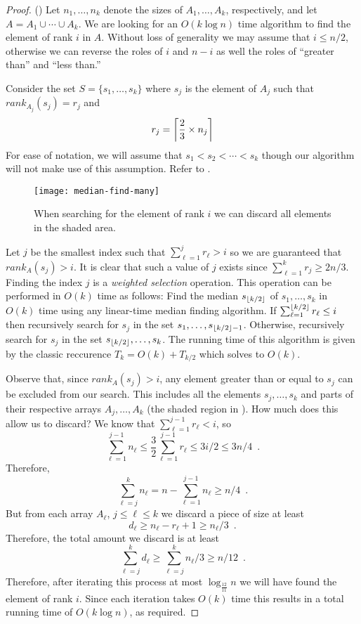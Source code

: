 \documentclass{njcarticle}
\newcommand{\rank}{\mathord{rank}}
\begin{document}
\begin{proof}() 
Let $n_1,\ldots,n_k$ denote the sizes of $A_1,\ldots,A_k$,
respectively, and let $A=A_1\cup\cdots\cup A_k$.  We are looking for
an $O(k\log n)$ time algorithm to find the element of rank $i$ in $A$.
Without loss of generality we may assume that $i\le n/2$, otherwise we
can reverse the roles of $i$ and $n-i$ as well the roles of ``greater
than'' and ``less than.''  

Consider the set $S=\{s_1,\ldots,s_k\}$ where $s_j$ is the element
of $A_j$ such that $\rank_{A_j}(s_j)=r_j$ and 
\[
  r_j = \left\lceil \frac{2}{3}\times n_j \right\rceil
\]
For ease of notation, we will assume that $s_1<s_2<\cdots<s_k$ though
our algorithm will not make use of this assumption.  Refer to
. 

\begin{figure}
\begin{center}\texttt{[image: median-find-many]}\end{center}
\caption{When searching for the element of rank $i$ we can discard all
elements in the shaded area.}
\end{figure}

Let $j$ be the smallest index such that $\sum_{\ell=1}^j r_\ell > i$ so we
are guaranteed that $\rank_A(s_j) > i$.  It is clear that such a value
of $j$ exists since $\sum_{\ell=1}^k r_j\ge 2n/3$.  Finding the index $j$
is a \emph{weighted selection} operation.  This operation can be
performed in $O(k)$ time as follows:  Find the median $s_{\left\lfloor k/2 \right\rfloor}$
of $s_1,\ldots,s_k$ in $O(k)$ time using any linear-time median
finding algorithm.  If $\sum_{\ell=1}^{\left\lfloor k/2 \right\rfloor} r_\ell \le i$ then
recursively search for $s_j$ in the set
$s_1,\ldots,s_{\left\lfloor k/2 \right\rfloor-1}$.  Otherwise, recursively search for
$s_j$ in the set $s_{\left\lfloor k/2 \right\rfloor},\ldots,s_k$.  The running time of this
algorithm is given by the classic reccurence $T_k=O(k)+T_{k/2}$ which
solves to $O(k)$.

Observe that, since $\rank_A(s_{j})>i$, any element greater than or
equal to $s_j$ can be excluded from our search.  This includes all the
elements $s_j,\ldots,s_k$ and parts of their respective arrays
$A_j,\ldots,A_k$ (the shaded region in ).  
How much does this allow us to discard?  We know that
$\sum_{\ell=1}^{j-1} r_\ell < i$, so 
\[
   \sum_{\ell=1}^{j-1} n_\ell \le \frac{3}{2}\sum_{\ell=1}^{j-1} r_\ell \le 3i/2 \le 3n/4 \enspace .
\]
Therefore, 
\[
   \sum_{\ell=j}^k n_\ell = n - \sum_{\ell=1}^{j-1} n_\ell \ge n/4 \enspace .
\]
But from each array $A_\ell$, $j\le \ell\le k$ we discard a piece of size at
least
\[
    d_\ell \ge n_\ell - r_\ell + 1 \ge n_\ell/3 \enspace .
\]
Therefore, the total amount we discard is at least
\[
    \sum_{\ell=j}^k d_\ell \ge \sum_{\ell=j}^k n_\ell/3 \ge n/12 \enspace .
\]
Therefore, after iterating this process at most $\log_\frac{12}{11} n$ we will
have found the element of rank $i$.  Since each iteration takes $O(k)$ time
this results in a total running time of $O(k\log n)$, as required.
\end{proof}
\end{document}
